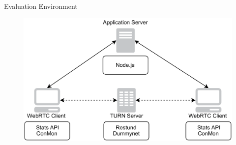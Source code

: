 \documentclass[first=red,second=purple,logo=yellowexc]{aaltoslides}
\begin{document}
\begin{frame}{Evaluation Environment}

\begin{figure}[h]
  \centering
  \includegraphics[width=1\textwidth]{evaluation_arch.pdf}
\end{figure}
\end{frame}

\end{document}
